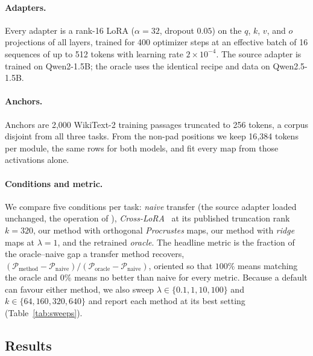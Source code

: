 \paragraph{Adapters.}
Every adapter is a rank-16 LoRA ($\alpha=32$, dropout $0.05$) on the
$q$, $k$, $v$, and $o$ projections of all layers, trained for 400 optimizer
steps at an effective batch of 16 sequences of up to 512 tokens with learning
rate $2\times10^{-4}$. The source adapter is trained on Qwen2-1.5B; the
oracle uses the identical recipe and data on Qwen2.5-1.5B.

\paragraph{Anchors.}
Anchors are 2{,}000 WikiText-2 training passages truncated to 256 tokens,
a corpus disjoint from all three tasks. From the non-pad positions we keep
16{,}384 tokens per module, the same rows for both models, and fit every map
from those activations alone.

\paragraph{Conditions and metric.}
We compare five conditions per task: \emph{naive} transfer (the source adapter
loaded unchanged, the operation of \citealp{lin2025finetuningtransfer}),
\emph{Cross-LoRA}~\citep{xia2025crosslora} at its published truncation rank
$k=320$, our method with orthogonal \emph{Procrustes} maps, our method with
\emph{ridge} maps at $\lambda=1$, and the retrained \emph{oracle}. The headline
metric is the fraction of the oracle--naive gap a transfer method recovers,
$(\mathcal{P}_{\mathrm{method}}-\mathcal{P}_{\mathrm{naive}})/(\mathcal{P}_{\mathrm{oracle}}-\mathcal{P}_{\mathrm{naive}})$,
oriented so that $100\%$ means matching the oracle and $0\%$ means no better
than naive for every metric. Because a default can favour either method, we
also sweep $\lambda\in\{0.1,1,10,100\}$ and $k\in\{64,160,320,640\}$ and
report each method at its best setting (Table~\ref{tab:sweeps}).

\subsection{Results}
\label{sec:experiments:results}


